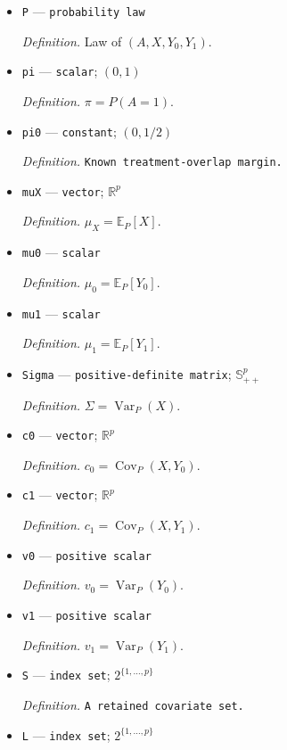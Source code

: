 \documentclass{article}
\begin{document}
\begin{itemize}
  \item \texttt{P} --- \texttt{probability law}
  \par\smallskip\noindent\emph{Definition.} Law of \((A,X,Y_0,Y_1)\).
  \item \texttt{pi} --- \texttt{scalar}; \((0,1)\)
  \par\smallskip\noindent\emph{Definition.} \(\pi=P(A=1)\).
  \item \texttt{pi0} --- \texttt{constant}; \((0,1/2)\)
  \par\smallskip\noindent\emph{Definition.} \texttt{Known treatment-\allowbreak{}overlap margin.}
  \item \texttt{muX} --- \texttt{vector}; \(\mathbb R^p\)
  \par\smallskip\noindent\emph{Definition.} \(\mu_X=\mathbb E_P[X]\).
  \item \texttt{mu0} --- \texttt{scalar}
  \par\smallskip\noindent\emph{Definition.} \(\mu_0=\mathbb E_P[Y_0]\).
  \item \texttt{mu1} --- \texttt{scalar}
  \par\smallskip\noindent\emph{Definition.} \(\mu_1=\mathbb E_P[Y_1]\).
  \item \texttt{Sigma} --- \texttt{positive-\allowbreak{}definite matrix}; \(\mathbb S_{++}^p\)
  \par\smallskip\noindent\emph{Definition.} \(\Sigma=\operatorname{Var}_P(X)\).
  \item \texttt{c0} --- \texttt{vector}; \(\mathbb R^p\)
  \par\smallskip\noindent\emph{Definition.} \(c_0=\operatorname{Cov}_P(X,Y_0)\).
  \item \texttt{c1} --- \texttt{vector}; \(\mathbb R^p\)
  \par\smallskip\noindent\emph{Definition.} \(c_1=\operatorname{Cov}_P(X,Y_1)\).
  \item \texttt{v0} --- \texttt{positive scalar}
  \par\smallskip\noindent\emph{Definition.} \(v_0=\operatorname{Var}_P(Y_0)\).
  \item \texttt{v1} --- \texttt{positive scalar}
  \par\smallskip\noindent\emph{Definition.} \(v_1=\operatorname{Var}_P(Y_1)\).
  \item \texttt{S} --- \texttt{index set}; \(2^{\{1,\ldots,p\}}\)
  \par\smallskip\noindent\emph{Definition.} \texttt{A retained covariate set.}
  \item \texttt{L} --- \texttt{index set}; \(2^{\{1,\ldots,p\}}\)

\end{itemize}
\end{document}

